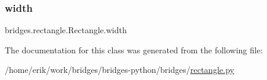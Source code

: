 \mbox{\label{classbridges_1_1rectangle_1_1_rectangle_ac70360e861fb0dfab5fae8525ffc86ba}} 
\subsubsection{\texorpdfstring{width}{width}}
{\footnotesize\ttfamily bridges.\+rectangle.\+Rectangle.\+width}



The documentation for this class was generated from the following file\+:\begin{DoxyCompactItemize}
\item 
/home/erik/work/bridges/bridges-\/python/bridges/\hyperlink{rectangle_8py}{rectangle.\+py}\end{DoxyCompactItemize}
